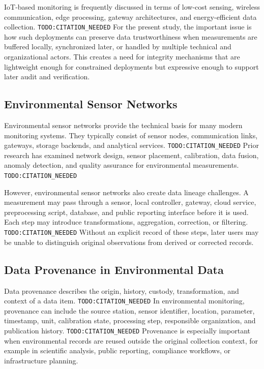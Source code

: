 IoT-based monitoring is frequently discussed in terms of low-cost sensing, wireless communication, edge processing, gateway architectures, and energy-efficient data collection. \texttt{TODO:CITATION\_NEEDED} For the present study, the important issue is how such deployments can preserve data trustworthiness when measurements are buffered locally, synchronized later, or handled by multiple technical and organizational actors. This creates a need for integrity mechanisms that are lightweight enough for constrained deployments but expressive enough to support later audit and verification.

\subsection{Environmental Sensor Networks}

Environmental sensor networks provide the technical basis for many modern monitoring systems. They typically consist of sensor nodes, communication links, gateways, storage backends, and analytical services. \texttt{TODO:CITATION\_NEEDED} Prior research has examined network design, sensor placement, calibration, data fusion, anomaly detection, and quality assurance for environmental measurements. \texttt{TODO:CITATION\_NEEDED}

However, environmental sensor networks also create data lineage challenges. A measurement may pass through a sensor, local controller, gateway, cloud service, preprocessing script, database, and public reporting interface before it is used. Each step may introduce transformations, aggregation, correction, or filtering. \texttt{TODO:CITATION\_NEEDED} Without an explicit record of these steps, later users may be unable to distinguish original observations from derived or corrected records.

\subsection{Data Provenance in Environmental Data}

Data provenance describes the origin, history, custody, transformation, and context of a data item. \texttt{TODO:CITATION\_NEEDED} In environmental monitoring, provenance can include the source station, sensor identifier, location, parameter, timestamp, unit, calibration state, processing step, responsible organization, and publication history. \texttt{TODO:CITATION\_NEEDED} Provenance is especially important when environmental records are reused outside the original collection context, for example in scientific analysis, public reporting, compliance workflows, or infrastructure planning.


